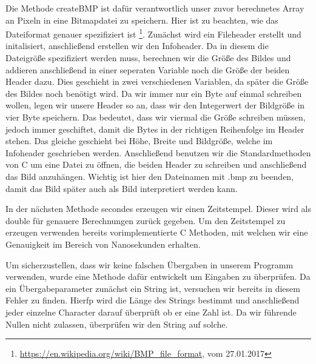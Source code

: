 \documentclass[11pt]{scrartcl}
\begin{document}
Die Methode createBMP ist dafür verantwortlich unser zuvor berechnetes Array an Pixeln in eine Bitmapdatei zu speichern.
Hier ist zu beachten, wie das Dateiformat genauer spezifiziert ist \footnote{\label{not:wikiBMP}\url{https://en.wikipedia.org/wiki/BMP_file_format}, vom 27.01.2017}.
Zunächst wird ein Fileheader erstellt und initalisiert, anschließend erstellen wir den Infoheader.
Da in diesem die Dateigröße spezifiziert werden muss, berechnen wir die Größe des Bildes und addieren anschließend in einer seperaten Variable noch die Größe der beiden Header dazu.
Dies geschieht in zwei verschiedenen Variablen, da später die Größe des Bildes noch benötigt wird.
Da wir immer nur ein Byte auf einmal schreiben wollen, legen wir unsere Header so an, dass wir den Integerwert der Bildgröße in vier Byte speichern.
Das bedeutet, dass wir viermal die Größe schreiben müssen, jedoch immer geschiftet, damit die Bytes in der richtigen Reihenfolge im Header stehen.
Das gleiche geschieht bei Höhe, Breite und Bildgröße, welche im Infoheader geschrieben werden.
Anschließend benutzen wir die Standardmethoden von C um eine Datei zu öffnen, die beiden Header zu schreiben und anschließend das Bild anzuhängen.
Wichtig ist hier den Dateinamen mit .bmp zu beenden, damit das Bild später auch als Bild interpretiert werden kann.

In der nächsten Methode secondes erzeugen wir einen Zeitstempel.
Dieser wird als double für genauere Berechnungen zurück gegeben.
Um den Zeitstempel zu erzeugen verwenden bereits vorimplementierte C Methoden, mit welchen wir eine Genauigkeit im Bereich von Nanosekunden erhalten.

Um sicherzustellen, dass wir keine falschen Übergaben in unserem Programm verwenden, wurde eine Methode dafür entwickelt um Eingaben zu überprüfen.
Da ein Übergabeparameter zunächst ein String ist, versuchen wir bereits in diesem Fehler zu finden.
Hierfp wird die Länge des Strings bestimmt und anschließend jeder einzelne Character darauf überprüft ob er eine Zahl ist.
Da wir führende Nullen nicht zulassen, überprüfen wir den String auf solche.
\end{document}
